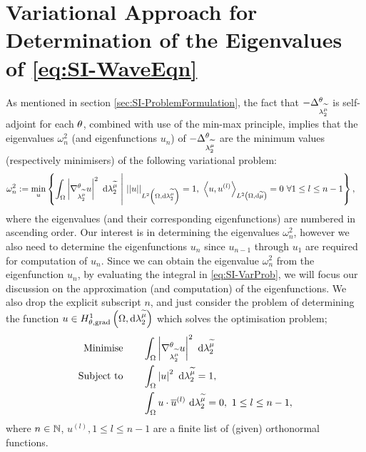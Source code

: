 \section{Variational Approach for Determination of the Eigenvalues of \eqref{eq:SI-WaveEqn}} \label{sec:SI-VarProbMethod}
As mentioned in section \ref{sec:SI-ProblemFormulation}, the fact that $-\Delta_{\lambda_2^{\widetilde{\mu}}}^\theta$ is self-adjoint for each $\theta$, combined with use of the min-max principle, implies that the eigenvalues $\omega_{n}^2$ (and eigenfunctions $u_n$) of $-\Delta_{\lambda_2^{\widetilde{\mu}}}^\theta$ are the minimum values (respectively minimisers) of the following variational problem:
\begin{align} \label{eq:SI-VarProb}
	\omega_n^2 &:= \min_{u}\clbracs{ \integral{\ddom}{ \abs{\tgrad_{\ccompMes}u}^2 }{\ccompMes} \setVert \norm{u}_{\ltwo{\ddom}{\ccompMes}}=1, \ \ip{u}{u^{(l)}}_{\ltwo{\ddom}{\dddmes}}=0 \ \forall 1\leq l\leq n-1 },
\end{align} 
where the eigenvalues (and their corresponding eigenfunctions) are numbered in ascending order.
Our interest is in determining the eigenvalues $\omega_n^2$, however we also need to determine the eigenfunctions $u_n$ since $u_{n-1}$ through $u_1$ are required for computation of $u_{n}$.
Since we can obtain the eigenvalue $\omega_n^2$ from the eigenfunction $u_n$, by evaluating the integral in \eqref{eq:SI-VarProb}, we will focus our discussion on the approximation (and computation) of the eigenfunctions.
We also drop the explicit subscript $n$, and just consider the problem of determining the function $u\in H^1_{\theta, \mathrm{grad}}\left( \Omega, \mathrm{d}\lambda_2^{\widetilde{\mu}} \right)$ which solves the optimisation problem;
\begin{subequations} \label{eq:SI-MinProblem}
	\begin{align}
		\text{Minimise} \quad & \quad \int_{\Omega} \left\lvert \nabla^{\theta}_{\lambda_2^{\widetilde{\mu}}}u \right\rvert^2  \ \mathrm{d}\lambda_2^{\widetilde{\mu}} \\
		\text{Subject to} \quad & \quad \int_{\Omega} \left\lvert u \right\rvert^2  \ \mathrm{d}\lambda_2^{\widetilde{\mu}} = 1, \\
		& \quad \int_{\Omega} u\cdot\overline{u}^{(l)}  \ \mathrm{d}\lambda_2^{\widetilde{\mu}} = 0, \ 1\leq l\leq n-1,
	\end{align}
\end{subequations}
where $n\in\mathbb{N}$, $u^{(l)}, 1\leq l\leq n-1$ are a finite list of (given) orthonormal functions.

